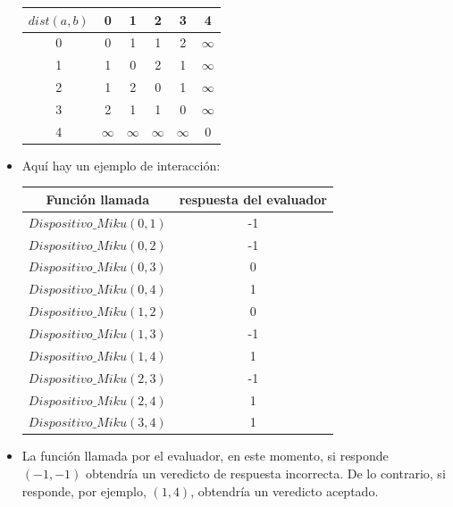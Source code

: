 \documentclass[12pt]{scrartcl}
\begin{document}
\begin{itemize}
            \begin{center}
                \begin{tabular}{|c||c|c|c|c|c|}
                    \hline
                    $dist(a, b)$ & 0 & 1 & 2 & 3 & 4 \\
                    \hline
                    \hline
                     0 & 0 & 1 & 1 & 2 & $\infty$ \\
                     \hline
                     1 & 1 & 0 & 2 & 1 & $\infty$ \\
                     \hline
                     2 & 1 & 2 & 0 & 1 & $\infty$ \\
                     \hline
                     3 & 2 & 1 & 1 & 0 & $\infty$ \\
                     \hline
                     4 & $\infty$ & $\infty$ & $\infty$ & $\infty$ & 0 \\
                     \hline 
                \end{tabular}
            \end{center}
            \item Aquí hay un ejemplo de interacción:
            \begin{center}
                \begin{tabular}{|c|c|}
                    \hline
                     Función llamada & respuesta del evaluador \\
                     \hline 
                     \hline 
                     $Dispositivo\_Miku(0, 1)$ & -1 \\
                     \hline 
                     $Dispositivo\_Miku(0, 2)$ & -1 \\
                     \hline 
                     $Dispositivo\_Miku(0, 3)$ & 0 \\
                     \hline 
                     $Dispositivo\_Miku(0, 4)$ & 1 \\
                     \hline 
                     $Dispositivo\_Miku(1, 2)$ & 0 \\
                     \hline 
                     $Dispositivo\_Miku(1, 3)$ & -1 \\
                     \hline 
                     $Dispositivo\_Miku(1, 4)$ & 1 \\
                     \hline 
                     $Dispositivo\_Miku(2, 3)$ & -1 \\
                     \hline 
                     $Dispositivo\_Miku(2, 4)$ & 1 \\
                     \hline 
                     $Dispositivo\_Miku(3, 4)$ & 1 \\
                     \hline 
                \end{tabular}
            \end{center}
            \item La función llamada por el evaluador, en este momento, si responde $(-1, -1)$ obtendría un veredicto de respuesta incorrecta. De lo contrario, si responde, por ejemplo, $(1, 4)$, obtendría un veredicto aceptado.
        \end{itemize}
        
\end{document}
